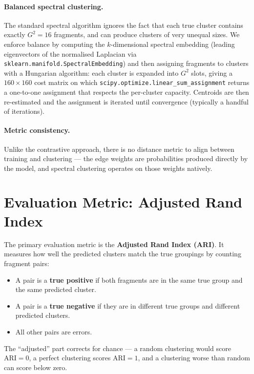 \documentclass[12pt, a4paper]{article}
\begin{document}
\paragraph{Balanced spectral clustering.}
The standard spectral algorithm ignores the fact that each true cluster contains
exactly $G^2 = 16$ fragments, and can produce clusters of very unequal sizes. We
enforce balance by computing the $k$-dimensional spectral embedding (leading
eigenvectors of the normalised Laplacian via \texttt{sklearn.manifold.SpectralEmbedding})
and then assigning fragments to clusters with a Hungarian algorithm: each cluster is
expanded into $G^2$ slots, giving a $160 \times 160$ cost matrix on which
\texttt{scipy.optimize.linear\_sum\_assignment} returns a one-to-one assignment that
respects the per-cluster capacity. Centroids are then re-estimated and the assignment
is iterated until convergence (typically a handful of iterations).

\paragraph{Metric consistency.}
Unlike the contrastive approach, there is no distance metric to align between training
and clustering — the edge weights are probabilities produced directly by the model, and
spectral clustering operates on those weights natively.

\section{Evaluation Metric: Adjusted Rand Index}

The primary evaluation metric is the \textbf{Adjusted Rand Index (ARI)}. It measures
how well the predicted clusters match the true groupings by counting fragment pairs:

\begin{itemize}
    \item A pair is a \textbf{true positive} if both fragments are in the same true group
          and the same predicted cluster.
    \item A pair is a \textbf{true negative} if they are in different true groups and
          different predicted clusters.
    \item All other pairs are errors.
\end{itemize}

The ``adjusted'' part corrects for chance — a random clustering would score
$\text{ARI} = 0$, a perfect clustering scores $\text{ARI} = 1$, and a clustering
worse than random can score below zero.
\end{document}
